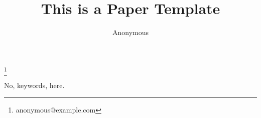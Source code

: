 \documentclass{entcs} \usepackage{entcsmacro}
\begin{document}
\begin{frontmatter}
	\title{This is a Paper Template}
	\author{Anonymous}
	\address{Anonymous Institution}
	\thanks[ALL]{anonymous@example.com}

	\begin{abstract}
		
	\end{abstract}
	\begin{keyword}
		No, keywords, here.
	\end{keyword}
\end{frontmatter}

\pagestyle{empty}













\appendix

\end{document}

